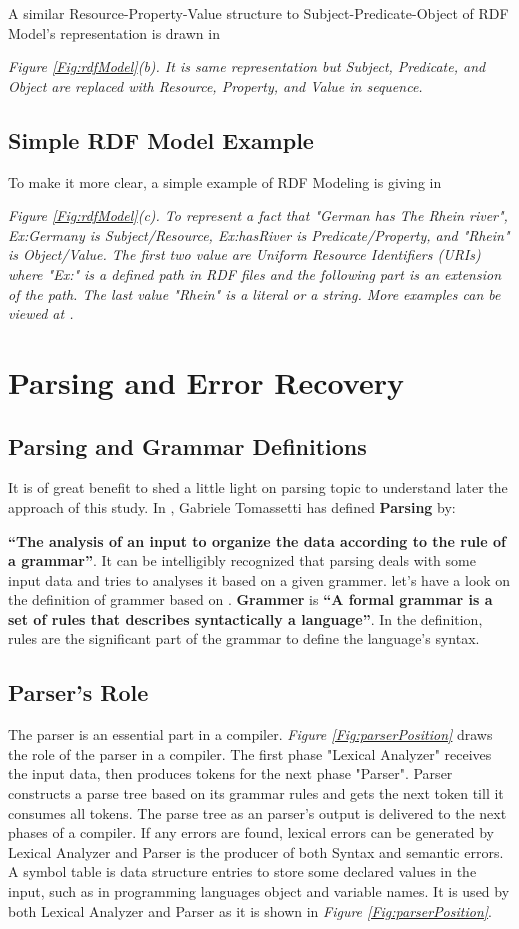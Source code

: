 {{{A similar Resource-Property-Value structure to Subject-Predicate-Object of RDF Model's representation is drawn in {\it Figure \ref{Fig:rdfModel}(b). It is same representation but Subject, Predicate, and Object are replaced with Resource, Property, and Value in sequence.  
\subsection{Simple RDF Model Example}

To make it more clear, a simple example of RDF Modeling is giving in {\it Figure \ref{Fig:rdfModel}(c). To represent a fact that "German has The Rhein river", Ex:Germany is Subject/Resource, Ex:hasRiver is Predicate/Property, and "Rhein" is Object/Value. The first two value are Uniform Resource Identifiers (URIs) where "Ex:" is a defined path in RDF files and the following part is an extension of the path. The last value "Rhein" is a literal or a string. More examples can be viewed at \cite{W3C:RDF-Primer:Online}.

\section{Parsing and Error Recovery}
\subsection{Parsing and Grammar Definitions}
It is of great benefit to shed a little light on parsing topic to understand later the approach of this study. In \cite{parsingGuide2017}, Gabriele Tomassetti has defined \textbf{Parsing} by:

	\textbf{``The analysis of an input to organize the data according to the rule of a grammar''}. It can be intelligibly recognized that parsing deals with some input data and tries to analyses it based on a given grammer. let's have a look on the definition of grammer based on  \cite{parsingGuide2017}. \textbf{Grammer} is 
\textbf{``A formal grammar is a set of rules that describes syntactically a language''}. In the definition, rules are the significant part of the grammar to define the language's syntax.  
\subsection{Parser's Role}
The parser is an essential part in a compiler. {\it Figure \ref{Fig:parserPosition}} draws the role of the parser in a compiler. The first phase "Lexical Analyzer" receives the input data, then produces tokens for the next phase "Parser". Parser constructs a parse tree based on its grammar rules and gets the next token till it consumes all tokens. The parse tree as an parser's output is delivered to the next phases of a compiler. If any errors are found, lexical errors can be generated by Lexical Analyzer and Parser is the producer of both Syntax and semantic errors.%
 A symbol table is data structure entries to store some declared values in the input, such as in programming languages object and variable names. It is used by both  Lexical Analyzer and Parser as it is shown in {\it Figure \ref{Fig:parserPosition}}.

}}}}}
